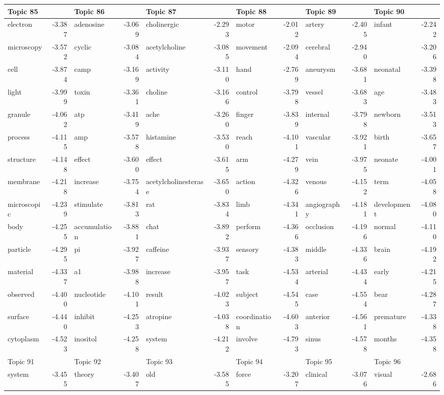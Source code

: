 \documentclass{article}
\begin{document}
\begin{table}
{\begin{tabular}{|l r|l r|l r|l r|l r|l r|}
\hline
\hline
Topic 85 & &Topic 86 & &Topic 87 & &Topic 88 & &Topic 89 & &Topic 90 &\\
\hline
electron & -3.387 & adenosine & -3.069 & cholinergic & -2.293 & motor & -2.012 & artery & -2.405 & infant & -2.242\\
microscopy & -3.572 & cyclic & -3.084 & acetylcholine & -3.085 & movement & -2.094 & cerebral & -2.940 &  & -3.206\\
cell & -3.874 & camp & -3.169 & activity & -3.110 & hand & -2.769 & aneurysm & -3.681 & neonatal & -3.398\\
light & -3.999 & toxin & -3.361 & choline & -3.166 & control & -3.798 & vessel & -3.683 & age & -3.483\\
granule & -4.062 & atp & -3.419 & ache & -3.260 & finger & -3.839 & internal & -3.798 & newborn & -3.513\\
process & -4.115 & amp & -3.578 & histamine & -3.530 & reach & -4.101 & vascular & -3.921 & birth & -3.657\\
structure & -4.148 & effect & -3.600 & effect & -3.615 & arm & -4.279 & vein & -3.975 & neonate & -4.001\\
membrane & -4.218 & increase & -3.754 & acetylcholinesterase & -3.650 & action & -4.326 & venous & -4.152 & term & -4.058\\
microscopic & -4.239 & stimulate & -3.813 & rat & -3.834 & limb & -4.341 & angiography & -4.181 & development & -4.080\\
body & -4.255 & accumulation & -3.881 & chat & -3.892 & perform & -4.366 & occlusion & -4.196 & normal & -4.110\\
particle & -4.295 & pi & -3.927 & caffeine & -3.937 & sensory & -4.383 & middle & -4.336 & brain & -4.192\\
material & -4.337 & a1 & -3.988 & increase & -3.957 & task & -4.534 & arterial & -4.434 & early & -4.215\\
observed & -4.400 & nucleotide & -4.101 & result & -4.023 & subject & -4.545 & case & -4.554 & bear & -4.287\\
surface & -4.440 & inhibit & -4.253 & atropine & -4.038 & coordination & -4.603 & anterior & -4.561 & premature & -4.338\\
cytoplasm & -4.523 & inositol & -4.258 & system & -4.212 & involve & -4.793 & sinus & -4.578 & months & -4.358\\
\hline
\hline
Topic 91 & &Topic 92 & &Topic 93 & &Topic 94 & &Topic 95 & &Topic 96 &\\
\hline
system & -3.455 & theory & -3.407 & old & -3.585 & force & -3.207 & clinical & -3.076 & visual & -2.686\\

\end{tabular}}
\end{table}
\end{document}
